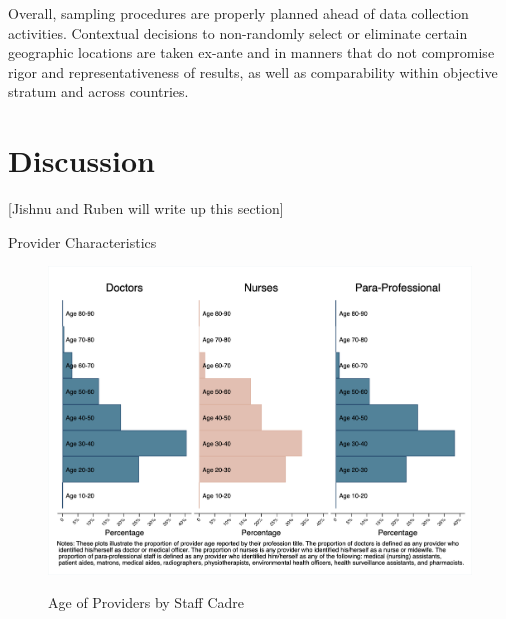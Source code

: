 \documentclass{article}                 %
\begin{document}
	Overall, sampling procedures are properly planned ahead of data collection activities. Contextual decisions to non-randomly select or eliminate certain geographic locations  are taken ex-ante and in manners that do not compromise rigor and representativeness of results, as well as comparability within objective stratum and across countries. 
	
	
	\section{Discussion}
	
	[Jishnu and Ruben will write up this section]

	\newpage

	
	 
	
	\newpage
	
			\begin{table}[H]
				\centering
				\caption{Provider Characteristics}
						\begin{adjustbox}{max width=1\textwidth}
							
						\end{adjustbox}	
						\label{prov_des}
			\end{table}
		
			\begin{figure}[H] 
				\centering
				\caption{Age of Providers by  Staff Cadre} 
						\includegraphics[width=\textwidth]{"../Output/Final/Per_providers_occ"}
						\label{age_prov}
			\end{figure}
		
\end{document}
